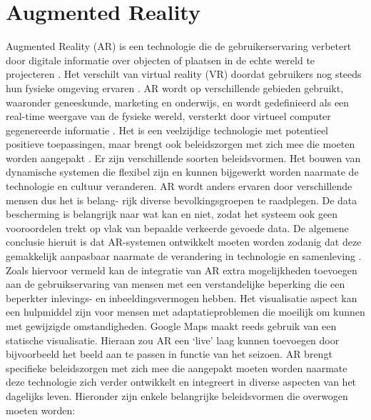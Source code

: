 \section{Augmented Reality}
\label{sec:augmented-reality}

Augmented Reality (AR) is een technologie die de gebruikerservaring verbetert door digitale informatie over objecten of plaatsen in de echte wereld te projecteren \autocite{Berryman2012}. Het verschilt van virtual reality (VR) doordat gebruikers nog steeds hun fysieke omgeving ervaren \autocite{Calo2015}. AR wordt op verschillende gebieden gebruikt, waaronder geneeskunde, marketing en onderwijs, en wordt gedefinieerd als een real-time weergave van de fysieke wereld, versterkt door virtueel computer gegenereerde informatie \autocite{Carmigniani2011}. Het is een veelzijdige technologie met potentieel positieve toepassingen, maar brengt ook beleidszorgen met zich mee die moeten worden aangepakt \autocite{Calo2015}. Er zijn verschillende soorten beleidsvormen. Het bouwen van dynamische systemen die flexibel zijn en kunnen bijgewerkt worden naarmate de technologie en cultuur veranderen. AR wordt anders ervaren door verschillende mensen dus het is belang- rijk diverse bevolkingsgroepen te raadplegen. De data bescherming is belangrijk naar wat kan en niet, zodat het systeem ook geen vooroordelen trekt op vlak van bepaalde verkeerde gevoede data. De algemene conclusie hieruit is dat AR-systemen ontwikkelt moeten worden zodanig dat deze gemakkelijk aanpasbaar naarmate de verandering in technologie en samenleving \autocite{Calo2015}. Zoals hiervoor vermeld kan de integratie van AR extra mogelijkheden toevoegen aan de gebruikservaring van mensen met een verstandelijke beperking die een beperkter inlevings- en inbeeldingsvermogen hebben. Het visualisatie aspect kan een hulpmiddel zijn voor mensen met adaptatieproblemen die moeilijk om kunnen met gewijzigde omstandigheden. Google Maps maakt reeds gebruik van een statische visualisatie. Hieraan zou AR een ‘live’ laag kunnen toevoegen door bijvoorbeeld het beeld aan te passen in functie van het seizoen. AR brengt specifieke beleidszorgen met zich mee die aangepakt moeten worden naarmate deze technologie zich verder ontwikkelt en integreert in diverse aspecten van het dagelijks leven. Hieronder zijn enkele belangrijke beleidsvormen die overwogen moeten worden:

